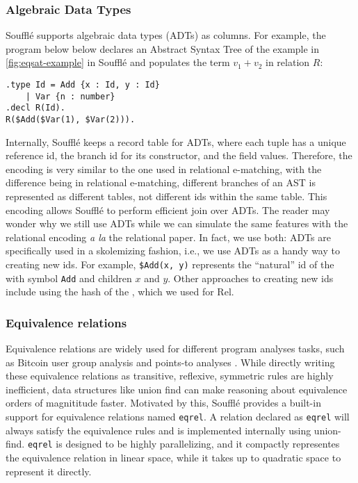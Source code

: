\subsubsection*{Algebraic Data Types}
Souffl\'e supports algebraic data types (ADTs) as columns.
For example, the program below below declares 
 an Abstract Syntax Tree of the example in \autoref{fig:eqsat-example}
 in Souffl\'e
 and populates the term $v_1+v_2$ in relation $R$:
\begin{verbatim}
.type Id = Add {x : Id, y : Id}
    | Var {n : number}
.decl R(Id).
R($Add($Var(1), $Var(2))).
\end{verbatim}

Internally, Souffl\'e keeps a record table for ADTs, 
 where each tuple has a unique reference id, 
 the branch id for its constructor, and
 the field values.
Therefore, 
 the encoding is very similar to the one used 
 in relational e-matching, with the difference being
 in relational e-matching, different branches of an AST
 is represented as different tables, 
 not different ids within the same table.
This encoding allows Souffl\'e to 
 perform efficient join over ADTs.
The reader may wonder 
 why we still use ADTs while we can 
 simulate the same features with 
 the relational encoding 
 \textit{a la} the relational \ematching paper.
In fact,
 we use both:
 ADTs are specifically used in a skolemizing fashion,
 i.e., we use ADTs as a handy way to creating new \eclass ids.
For example, \verb|$Add(x, y)| represents the ``natural'' \eclass id
 of the \enode with symbol \verb|Add| and children $x$ and $y$.
Other approaches to creating new \eclass ids include 
 using the hash of the \enodes, which we used for Rel.

\def\eqrel{\texttt{eqrel}}

\subsubsection*{Equivalence relations}
Equivalence relations are widely used 
 for different program analyses tasks, 
 such as Bitcoin user group analysis \citep{anonymity-bitcoin} 
 and points-to analyses \citep{multi-alaias-analysis,points-to-linear}.
While directly writing these equivalence relations as
 transitive, reflexive, symmetric rules are highly inefficient,
 data structures like union find \citep{unionfind} can 
 make reasoning about equivalence orders of magnititude faster.
Motivated by this, Souffl\'e provides a built-in support for 
 equivalence relations named \eqrel. 
A relation declared as \eqrel{} will
 always satisfy the equivalence rules 
 and is implemented internally using union-find.
\eqrel{} is designed to be highly parallelizing, 
 and it compactly representes the equivalence relation
 in linear space, while it takes up to quadratic space
 to represent it directly.

